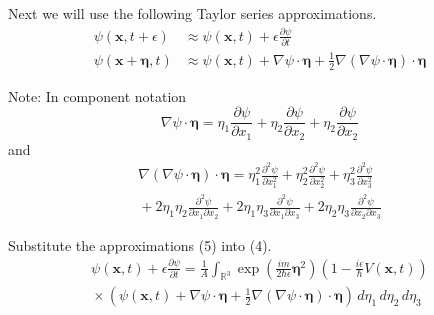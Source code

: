 \documentclass[12pt]{article}
\begin{document}
Next we will use the following Taylor series approximations.
\begin{equation*}
\begin{aligned}
\psi(\mathbf x,t+\epsilon)&\approx\psi(\mathbf x,t)+\epsilon\frac{\partial\psi}{\partial t}
\\
\psi(\mathbf x+\boldsymbol\eta,t)&\approx\psi(\mathbf x,t)+\nabla\psi\cdot\boldsymbol\eta
+\tfrac{1}{2}\nabla(\nabla\psi\cdot\boldsymbol\eta)\cdot\boldsymbol\eta
\end{aligned}
\tag{5}
\end{equation*}

Note: In component notation
\begin{equation*}
\nabla\psi\cdot\boldsymbol\eta=
\eta_1\frac{\partial\psi}{\partial x_1}+
\eta_2\frac{\partial\psi}{\partial x_2}+
\eta_2\frac{\partial\psi}{\partial x_2}
\end{equation*}
and
\begin{multline*}
\nabla(\nabla\psi\cdot\boldsymbol\eta)\cdot\boldsymbol\eta=
\eta_1^2\frac{\partial^2\psi}{\partial x_1^2}
+\eta_2^2\frac{\partial^2\psi}{\partial x_2^2}
+\eta_3^2\frac{\partial^2\psi}{\partial x_3^2}
\\
{}+2\eta_1\eta_2\frac{\partial^2\psi}{\partial x_1\partial x_2}
+2\eta_1\eta_3\frac{\partial^2\psi}{\partial x_1\partial x_3}
+2\eta_2\eta_3\frac{\partial^2\psi}{\partial x_2\partial x_3}
\end{multline*}

Substitute the approximations (5) into (4).
\begin{multline*}
\psi(\mathbf{x},t)+\epsilon\frac{\partial\psi}{\partial t}=
\frac{1}{A}\int_{\mathbb R^3}
\exp\left(\frac{im}{2\hbar\epsilon}\boldsymbol\eta^2\right)
\left(1-\frac{i\epsilon}{\hbar}V\left(\mathbf x,t\right)\right)
\\
{}\times\left(
\psi(\mathbf x,t)
+\nabla\psi\cdot\boldsymbol\eta
+\tfrac{1}{2}\nabla(\nabla\psi\cdot\boldsymbol\eta)\cdot\boldsymbol\eta
\right)\,d\eta_1\,d\eta_2\,d\eta_3
\tag{6}
\end{multline*}
\end{document}
